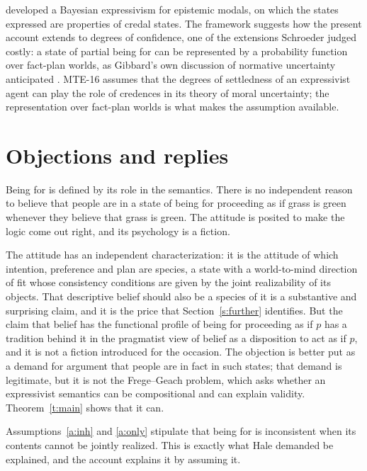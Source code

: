 \documentclass{situationist-preprint}
\begin{document}
\citet{Yalcin2012} developed a Bayesian expressivism for epistemic modals, on which the states expressed are properties of credal states. The framework suggests how the present account extends to degrees of confidence, one of the extensions Schroeder judged costly: a state of partial being for can be represented by a probability function over fact-plan worlds, as Gibbard's own discussion of normative uncertainty anticipated \citep{Gibbard2003}. MTE-16 assumes that the degrees of settledness of an expressivist agent can play the role of credences in its theory of moral uncertainty; the representation over fact-plan worlds is what makes the assumption available.

\section{Objections and replies}\label{s:obj}

\begin{objection}
Being for is defined by its role in the semantics. There is no independent reason to believe that people are in a state of being for proceeding as if grass is green whenever they believe that grass is green. The attitude is posited to make the logic come out right, and its psychology is a fiction.
\end{objection}

\begin{reply}
The attitude has an independent characterization: it is the attitude of which intention, preference and plan are species, a state with a world-to-mind direction of fit whose consistency conditions are given by the joint realizability of its objects. That descriptive belief should also be a species of it is a substantive and surprising claim, and it is the price that Section~\ref{s:further} identifies. But the claim that belief has the functional profile of being for proceeding as if $p$ has a tradition behind it in the pragmatist view of belief as a disposition to act as if $p$, and it is not a fiction introduced for the occasion. The objection is better put as a demand for argument that people are in fact in such states; that demand is legitimate, but it is not the Frege--Geach problem, which asks whether an expressivist semantics can be compositional and can explain validity. Theorem~\ref{t:main} shows that it can.
\end{reply}

\begin{objection}
Assumptions~\ref{a:inh} and \ref{a:only} stipulate that being for is inconsistent when its contents cannot be jointly realized. This is exactly what Hale demanded be explained, and the account explains it by assuming it.
\end{objection}
\end{document}
